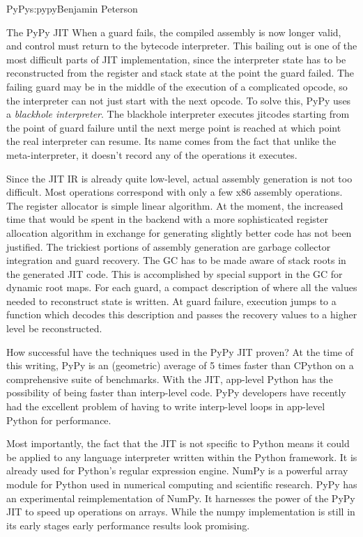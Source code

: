 \begin{aosachapter}{PyPy}{s:pypy}{Benjamin Peterson}
\begin{aosasect1}{The PyPy JIT}
When a guard fails, the compiled assembly is now longer valid, and control must
return to the bytecode interpreter. This bailing out is one of the most
difficult parts of JIT implementation, since the interpreter state has to be
reconstructed from the register and stack state at the point the guard
failed. The failing guard may be in the middle of the execution of a complicated
opcode, so the interpreter can not just start with the next opcode. To solve
this, PyPy uses a \emph{blackhole interpreter}. The blackhole interpreter
executes jitcodes starting from the point of guard failure until the next merge
point is reached at which point the real interpreter can resume. Its name comes
from the fact that unlike the meta-interpreter, it doesn't record any of the
operations it executes.

Since the JIT IR is already quite low-level, actual assembly generation is not
too difficult. Most operations correspond with only a few x86 assembly
operations. The register allocator is simple linear algorithm. At the moment,
the increased time that would be spent in the backend with a more sophisticated
register allocation algorithm in exchange for generating slightly better code
has not been justified. The trickiest portions of assembly generation are
garbage collector integration and guard recovery. The GC has to be made aware of
stack roots in the generated JIT code. This is accomplished by special support
in the GC for dynamic root maps. For each guard, a compact description of where
all the values needed to reconstruct state is written. At guard failure,
execution jumps to a function which decodes this description and passes the
recovery values to a higher level be reconstructed.

How successful have the techniques used in the PyPy JIT proven? At the time of
this writing, PyPy is an (geometric) average of 5 times faster than CPython on a
comprehensive suite of benchmarks. With the JIT, app-level Python has the
possibility of being faster than interp-level code. PyPy developers have
recently had the excellent problem of having to write interp-level loops in
app-level Python for performance.

Most importantly, the fact that the JIT is not specific to Python means it could
be applied to any language interpreter written within the Python framework. It
is already used for Python's regular expression engine. NumPy is a powerful
array module for Python used in numerical computing and scientific
research. PyPy has an experimental reimplementation of NumPy. It harnesses the
power of the PyPy JIT to speed up operations on arrays. While the numpy
implementation is still in its early stages early performance results look
promising.


\end{aosasect1}
\end{aosachapter}

